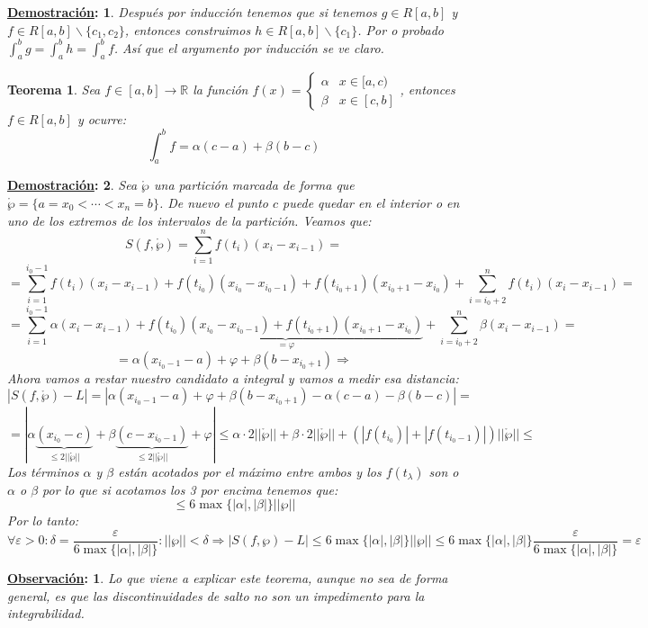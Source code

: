\documentclass[10pt,a4paper,openright]{book}
\theoremstyle{break}
\newtheorem*{theo}{Teorema}
\newtheorem*{demo}{\underline{Demostración}:}
\newtheorem*{obs}{\underline{Observación}:}
\begin{document}
\begin{demo}
Después por inducción tenemos que si tenemos $g\in R[a,b]$ y $f\in R[a,b]\backslash\{c_1, c_2\}$, entonces construimos $h\in R[a,b]\backslash\{c_1\}$. Por o probado $\int_a^b g = \int_a^b h= \int_a^b f$. Así que el argumento por inducción se ve claro.
\end{demo}

\begin{theo}
Sea $f\in[a,b]\rightarrow \mathbb R$ la función $f(x)=\begin{cases}\alpha & x\in [a,c) \\ \beta & x\in [c,b]\end{cases}$, entonces $f\in R[a,b]$ y ocurre:
$$\int_a^b f = \alpha (c-a)+\beta(b-c)$$
\end{theo}
\begin{demo}
Sea $\mathring{\wp}$ una partición marcada de forma que $\mathring{\wp} = \{a=x_0 < \cdots <x_n = b\}$. De nuevo el punto $c$ puede quedar en el interior o en uno de los extremos de los intervalos de la partición. Veamos que:
$$S(f,\mathring{\wp}) = \sum_{i=1}^n f(t_i)(x_i-x_{i-1}) = $$
$$=\sum_{i=1}^{i_0-1}f(t_i)(x_i-x_{i-1})+f(t_{i_0})(x_{i_0}-x_{i_0-1})+ f(t_{i_0+1})(x_{i_0+1}-x_{i_0})+\sum_{i=i_0+2}^n f(t_i)(x_i-x_{i-1}) = $$
$$= \sum_{i=1}^{i_0-1}\alpha(x_i-x_{i-1})+\underbrace{f(t_{i_0})(x_{i_0}-x_{i_0-1})+ f(t_{i_0+1})(x_{i_0+1}-x_{i_0})}_{=\varphi}+\sum_{i=i_0+2}^n \beta(x_i-x_{i-1})=$$
$$=\alpha(x_{i_0-1}-a)+\varphi+\beta(b-x_{i_0+1})\Rightarrow $$
Ahora vamos a restar nuestro candidato a integral y vamos a medir esa distancia:
$$\left|S(f,\mathring{\wp})-L \right| =\left|\alpha(x_{i_0-1}-a)+\varphi + \beta(b-x_{i_0+1})-\alpha (c-a)-\beta (b-c)\right| = $$
$$=\left| \alpha \underbrace{(x_{i_0}-c)}_{\leq 2||\mathring{\wp}||}+\beta \underbrace{(c-x_{i_0-1})}_{\leq 2||\mathring{\wp}||} + \varphi\right| \leq \alpha\cdot 2||\mathring{\wp}||+ \beta \cdot 2||\mathring{\wp}|| + \left( |f(t_{i_0})|+|f(t_{i_0-1})| \right)||\mathring{\wp}|| \leq$$
Los términos $\alpha$ y $\beta$ están acotados por el máximo entre ambos y los $f(t_\lambda)$ son o $\alpha$ o $\beta$ por lo que si acotamos los 3 por encima tenemos que:
$$\leq 6 \max\{|\alpha|,|\beta|\}||\wp||$$
Por lo tanto:
$$\forall \varepsilon >0 : \delta = \frac{\varepsilon}{6\max\{|\alpha|, |\beta|\}}: ||\wp||<\delta\Rightarrow \left|S(f,\wp)-L\right|\leq 6 \max\{|\alpha|,|\beta|\}||\wp|| \leq 6 \max\{|\alpha|,|\beta|\} \frac{\varepsilon}{6\max\{|\alpha|, |\beta|\}} = \varepsilon$$
\end{demo}

\begin{obs}
Lo que viene a explicar este teorema, aunque no sea de forma general, es que las discontinuidades de salto no son un impedimento para la integrabilidad.
\end{obs}
\end{document}
